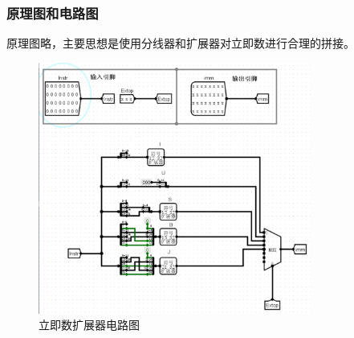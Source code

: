 \documentclass{article}
\begin{document}
    \subsubsection{原理图和电路图}
    原理图略，主要思想是使用分线器和扩展器对立即数进行合理的拼接。


    \begin{figure}[H]
    \centering
    \includegraphics[width=0.8\textwidth]{4.4.2.png}
    \caption{立即数扩展器电路图}
    \end{figure}
\end{document}

